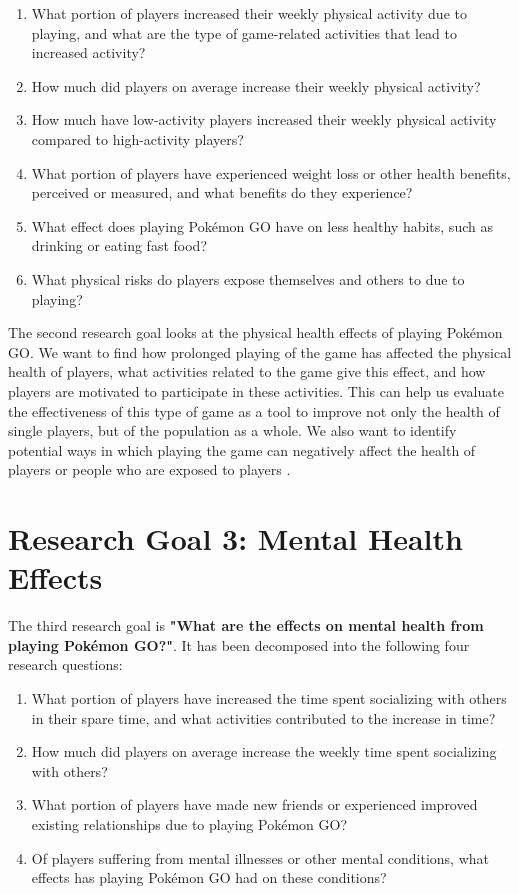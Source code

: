 \begin{enumerate}[label=RQ2.{\arabic*}]
	\item What portion of players increased their weekly physical activity due to playing, and what are the type of game-related activities that lead to increased activity?\label{RQ2.1}
	\item How much did players on average increase their weekly physical activity?\label{RQ2.2}
	\item How much have low-activity players increased their weekly physical activity compared to high-activity players?\label{RQ2.3}
	\item What portion of players have experienced weight loss or other health benefits, perceived or measured, and what benefits do they experience?\label{RQ2.4}
	\item What effect does playing Pokémon GO have on less healthy  habits, such as drinking or eating fast food?\label{RQ2.5}
	\item What physical risks do players expose themselves and others to due to playing?\label{RQ2.6}
\end{enumerate}

The second research goal looks at the physical health effects of playing Pokémon GO. We want to find how prolonged playing of the game has affected the physical health of players, what activities related to the game give this effect, and how players are motivated to participate in these activities. This can help us evaluate the effectiveness of this type of game as a tool to improve not only the health of single players, but of the population as a whole. We also want to identify potential ways in which playing the game can negatively affect the health of players or people who are exposed to players .

\section{Research Goal 3: Mental Health Effects}
\label{rg3}

The third research goal is \textbf{"What are the effects on mental health from playing Pokémon GO?"}. It has been decomposed into the following four research questions:

\begin{enumerate}[label=RQ3.{\arabic*}]
	\item What portion of players have increased the time spent socializing with others in their spare time, and what activities contributed to the increase in time?\label{RQ3.1}
	\item How much did players on average increase the weekly time spent socializing with others?\label{RQ3.2}
	\item What portion of players have made new friends or experienced improved existing relationships due to playing Pokémon GO?\label{RQ3.3}
	\item Of players suffering from mental illnesses or other mental conditions, what effects has playing Pokémon GO had on these conditions?\label{RQ3.4}
\end{enumerate}

